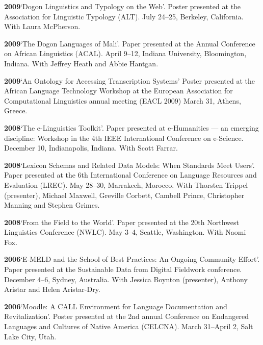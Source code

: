 \documentclass[11pt]{article}
\newcommand{\hangpara}{
 \setlength{\parindent}{0in} %
 \hangindent=0.42in %
}
\begin{document}
\vskip 6pt
\hangpara
{\bf 2009}\hspace{1ex}`Dogon Linguistics and Typology on the Web'. Poster presented at the Association for Linguistic Typology (ALT). July 24--25, Berkeley, California. With Laura McPherson.

\vskip 6pt
\hangpara
{\bf 2009}\hspace{1ex}`The Dogon Languages of Mali'. Paper presented at the Annual Conference on African Linguistics (ACAL). April 9--12, Indiana University, Bloomington, Indiana. With Jeffrey Heath and Abbie Hantgan.

\vskip 6pt
\hangpara
{\bf 2009}\hspace{1ex}`An Ontology for Accessing Transcription Systems' Poster presented at the African Language Technology Workshop at the European Association for Computational Linguistics annual meeting (EACL 2009) March 31, Athens, Greece.

\vskip 6pt
\hangpara
{\bf 2008}\hspace{1ex}`The e-Linguistics Toolkit'. Paper presented at e-Humanities --- an emerging discipline: Workshop in the 4th IEEE International Conference on e-Science. December 10, Indianapolis, Indiana. With Scott Farrar.

\vskip 6pt
\hangpara
{\bf 2008}\hspace{1ex}`Lexicon Schemas and Related Data Models: When Standards Meet Users'. Paper presented at the 6th International Conference on Language Resources and Evaluation (LREC). May 28--30, Marrakech, Morocco. With Thorsten Trippel (presenter), Michael Maxwell, Greville Corbett, Cambell Prince, Christopher Manning and Stephen Grimes.

\vskip 6pt
\hangpara
{\bf 2008}\hspace{1ex}`From the Field to the World'. Paper presented at the 20th Northwest Linguistics Conference (NWLC). May 3--4, Seattle, Washington. With Naomi Fox.

\vskip 6pt
\hangpara
{\bf 2006}\hspace{1ex}`E-MELD and the School of Best Practices: An Ongoing Community Effort'. Paper presented at the Sustainable Data from Digital Fieldwork conference. December 4--6, Sydney, Australia. With Jessica Boynton (presenter), Anthony Aristar and Helen Aristar-Dry. 

\vskip 6pt
\hangpara
{\bf 2006}\hspace{1ex}`Moodle: A CALL Environment for Language Documentation and Revitalization'. Poster presented at the 2nd annual Conference on Endangered Languages and Cultures of Native America (CELCNA). March 31--April 2, Salt Lake City, Utah.
\end{document}
